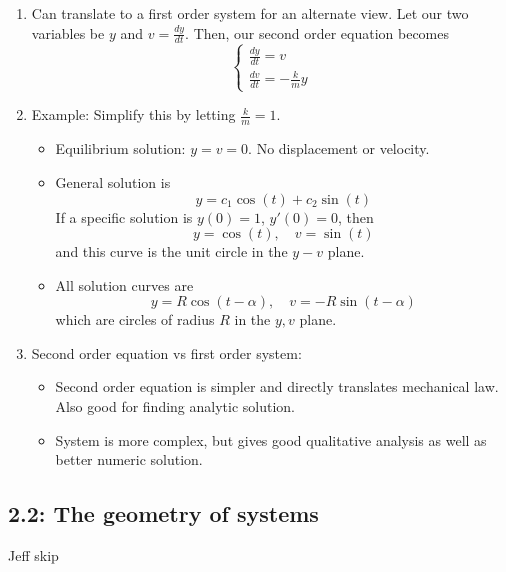 \documentclass{article}
\begin{document}
\begin{enumerate}
\begin{enumerate}
\item Can translate to a first order system for an alternate view. Let our two variables be $y$ and $v = \frac{dy}{dt}$. Then, our second order equation becomes
\[
\begin{cases}
\frac{dy}{dt} = v \\
\frac{dv}{dt} = - \frac{k}{m} y
\end{cases}
\]
\item Example: Simplify this by letting $\frac{k}{m}=1$.
\begin{itemize}
\item Equilibrium solution: $y=v=0$. No displacement or velocity.
\item General solution is 
\[
y = c_1 \cos(t) + c_2 \sin(t)
\]
If a specific solution is $y(0)=1$, $y'(0)=0$, then
\[
y = \cos(t), \quad v = \sin(t)
\]
and this curve is the unit circle in the $y-v$ plane.
\item All solution curves are 
\[
y = R\cos(t-\alpha), \quad v = -R\sin(t-\alpha)
\]
which are circles of radius $R$ in the $y,v$ plane.
\end{itemize}
\item Second order equation vs first order system:
\begin{itemize}
\item Second order equation is simpler and directly translates mechanical law. Also good for finding analytic solution.
\item System is more complex, but gives good qualitative analysis as well as better numeric solution.
\end{itemize}
\end{enumerate}

\end{enumerate}


\subsection{2.2: The geometry of systems}
Jeff skip
\end{document}

